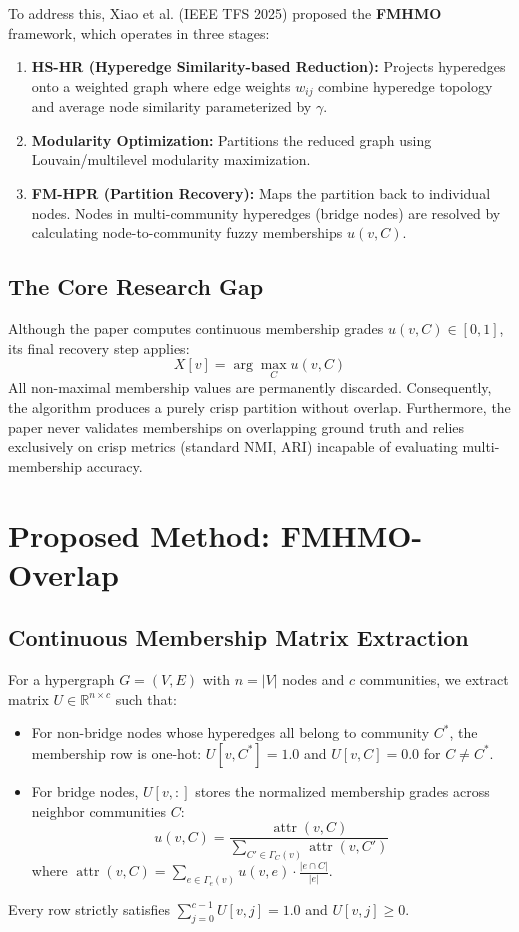 \documentclass[11pt,a4paper]{article}
\begin{document}
To address this, Xiao et al. (IEEE TFS 2025) proposed the \textbf{FMHMO} framework, which operates in three stages:
\begin{enumerate}
    \item \textbf{HS-HR (Hyperedge Similarity-based Reduction):} Projects hyperedges onto a weighted graph where edge weights $w_{ij}$ combine hyperedge topology and average node similarity parameterized by $\gamma$.
    \item \textbf{Modularity Optimization:} Partitions the reduced graph using Louvain/multilevel modularity maximization.
    \item \textbf{FM-HPR (Partition Recovery):} Maps the partition back to individual nodes. Nodes in multi-community hyperedges (bridge nodes) are resolved by calculating node-to-community fuzzy memberships $u(v, C)$.
\end{enumerate}

\subsection{The Core Research Gap}
Although the paper computes continuous membership grades $u(v, C) \in [0, 1]$, its final recovery step applies:
\begin{equation}
    X[v] = \arg\max_{C} u(v, C)
\end{equation}
All non-maximal membership values are permanently discarded. Consequently, the algorithm produces a purely crisp partition without overlap. Furthermore, the paper never validates memberships on overlapping ground truth and relies exclusively on crisp metrics (standard NMI, ARI) incapable of evaluating multi-membership accuracy.

\section{Proposed Method: FMHMO-Overlap}

\subsection{Continuous Membership Matrix Extraction}
For a hypergraph $G = (V, E)$ with $n = |V|$ nodes and $c$ communities, we extract matrix $U \in \mathbb{R}^{n \times c}$ such that:
\begin{itemize}
    \item For non-bridge nodes whose hyperedges all belong to community $C^*$, the membership row is one-hot: $U[v, C^*] = 1.0$ and $U[v, C] = 0.0$ for $C \neq C^*$.
    \item For bridge nodes, $U[v, :]$ stores the normalized membership grades across neighbor communities $C$:
    \begin{equation}
        u(v, C) = \frac{\operatorname{attr}(v, C)}{\sum_{C' \in \Gamma_C(v)} \operatorname{attr}(v, C')}
    \end{equation}
    where $\operatorname{attr}(v, C) = \sum_{e \in \Gamma_e(v)} u(v, e) \cdot \frac{|e \cap C|}{|e|}$.
\end{itemize}
Every row strictly satisfies $\sum_{j=0}^{c-1} U[v, j] = 1.0$ and $U[v, j] \ge 0$.
\end{document}
